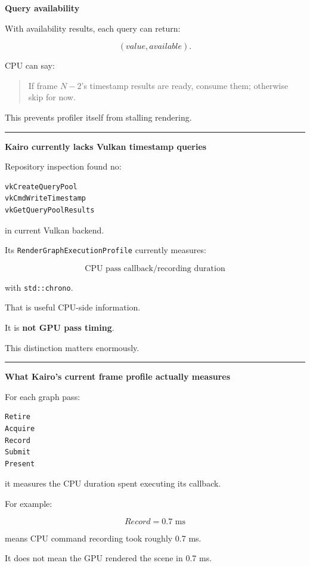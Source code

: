 \textbf{Query availability}

With availability results, each query can return:

\[
(value,available).
\]

CPU can say:

\begin{quote}
If frame \(N-2\)'s timestamp results are ready, consume them; otherwise skip for now.
\end{quote}

This prevents profiler itself from stalling rendering.

\begin{center}\rule{0.5\linewidth}{0.5pt}\end{center}

\textbf{Kairo currently lacks Vulkan timestamp queries}

Repository inspection found no:

\begin{verbatim}
vkCreateQueryPool
vkCmdWriteTimestamp
vkGetQueryPoolResults
\end{verbatim}

in current Vulkan backend.

Its \texttt{RenderGraphExecutionProfile} currently measures:

\[
\boxed{\text{CPU pass callback/recording duration}}
\]

with \texttt{std::chrono}.

That is useful CPU-side information.

It is \textbf{not GPU pass timing}.

This distinction matters enormously.

\begin{center}\rule{0.5\linewidth}{0.5pt}\end{center}

\textbf{What Kairo's current frame profile actually measures}

For each graph pass:

\begin{verbatim}
Retire
Acquire
Record
Submit
Present
\end{verbatim}

it measures the CPU duration spent executing its callback.

For example:

\[
Record=0.7\text{ ms}
\]

means CPU command recording took roughly 0.7 ms.

It does not mean the GPU rendered the scene in 0.7 ms.

